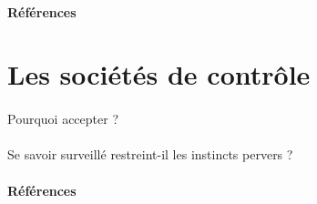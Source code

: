 \paragraph{Références} \cite{Damasio:0} \cite{Marx:1} \cite{TechnoSocio:0} \cite{GhostInTheShell}

\section{Les sociétés de contrôle}
\paragraph{} Pourquoi accepter ?
\paragraph{} Se savoir surveillé restreint-il les instincts pervers ?
\paragraph{Références} \cite{Huxley:0} \cite{Orwell:0} \cite{TechnoSocio:1}